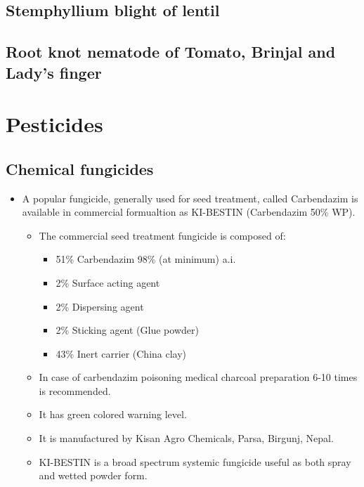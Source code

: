 \documentclass[
  openany]{book}
\providecommand{\tightlist}{%
  \setlength{\itemsep}{0pt}\setlength{\parskip}{0pt}}
\begin{document}
\hypertarget{stemphyllium-blight-of-lentil}{%
\subsection{Stemphyllium blight of lentil}\label{stemphyllium-blight-of-lentil}}

\hypertarget{root-knot-nematode-of-tomato-brinjal-and-ladys-finger}{%
\subsection{Root knot nematode of Tomato, Brinjal and Lady's finger}\label{root-knot-nematode-of-tomato-brinjal-and-ladys-finger}}

\hypertarget{pesticides}{%
\section{Pesticides}\label{pesticides}}

\hypertarget{chemical-fungicides}{%
\subsection{Chemical fungicides}\label{chemical-fungicides}}

\begin{itemize}
\tightlist
\item
  A popular fungicide, generally used for seed treatment, called Carbendazim is available in commercial formualtion as KI-BESTIN (Carbendazim 50\% WP).

  \begin{itemize}
  \tightlist
  \item
    The commercial seed treatment fungicide is composed of:

    \begin{itemize}
    \tightlist
    \item
      51\% Carbendazim 98\% (at minimum) a.i.
    \item
      2\% Surface acting agent
    \item
      2\% Dispersing agent
    \item
      2\% Sticking agent (Glue powder)
    \item
      43\% Inert carrier (China clay)
    \end{itemize}
  \item
    In case of carbendazim poisoning medical charcoal preparation 6-10 times is recommended.
  \item
    It has green colored warning level.
  \item
    It is manufactured by Kisan Agro Chemicals, Parsa, Birgunj, Nepal.
  \item
    KI-BESTIN is a broad spectrum systemic fungicide useful as both spray and wetted powder form.
  \end{itemize}
\end{itemize}
\end{document}
